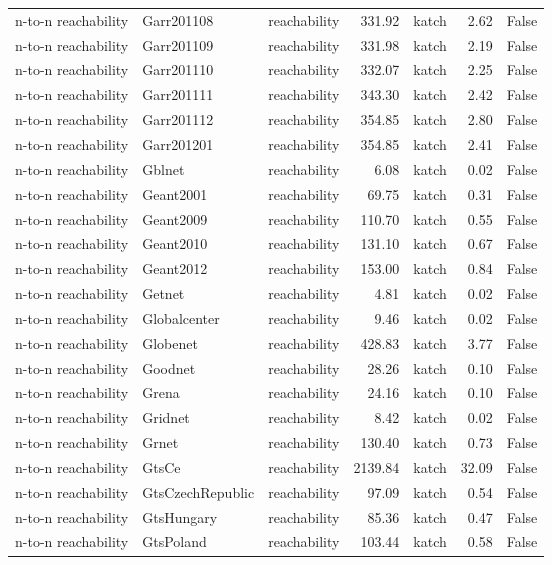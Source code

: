 \begin{tabular}{lllrlrr}
n-to-n reachability & Garr201108 & reachability & 331.92 & katch & 2.62 & False \\
n-to-n reachability & Garr201109 & reachability & 331.98 & katch & 2.19 & False \\
n-to-n reachability & Garr201110 & reachability & 332.07 & katch & 2.25 & False \\
n-to-n reachability & Garr201111 & reachability & 343.30 & katch & 2.42 & False \\
n-to-n reachability & Garr201112 & reachability & 354.85 & katch & 2.80 & False \\
n-to-n reachability & Garr201201 & reachability & 354.85 & katch & 2.41 & False \\
n-to-n reachability & Gblnet & reachability & 6.08 & katch & 0.02 & False \\
n-to-n reachability & Geant2001 & reachability & 69.75 & katch & 0.31 & False \\
n-to-n reachability & Geant2009 & reachability & 110.70 & katch & 0.55 & False \\
n-to-n reachability & Geant2010 & reachability & 131.10 & katch & 0.67 & False \\
n-to-n reachability & Geant2012 & reachability & 153.00 & katch & 0.84 & False \\
n-to-n reachability & Getnet & reachability & 4.81 & katch & 0.02 & False \\
n-to-n reachability & Globalcenter & reachability & 9.46 & katch & 0.02 & False \\
n-to-n reachability & Globenet & reachability & 428.83 & katch & 3.77 & False \\
n-to-n reachability & Goodnet & reachability & 28.26 & katch & 0.10 & False \\
n-to-n reachability & Grena & reachability & 24.16 & katch & 0.10 & False \\
n-to-n reachability & Gridnet & reachability & 8.42 & katch & 0.02 & False \\
n-to-n reachability & Grnet & reachability & 130.40 & katch & 0.73 & False \\
n-to-n reachability & GtsCe & reachability & 2139.84 & katch & 32.09 & False \\
n-to-n reachability & GtsCzechRepublic & reachability & 97.09 & katch & 0.54 & False \\
n-to-n reachability & GtsHungary & reachability & 85.36 & katch & 0.47 & False \\
n-to-n reachability & GtsPoland & reachability & 103.44 & katch & 0.58 & False \\

\end{tabular}
